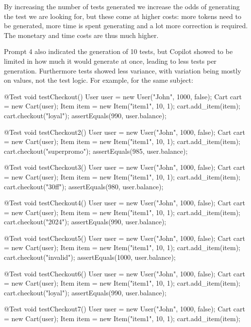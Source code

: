 By increasing the number of tests generated we increase the odds of generating the test we are looking for,
but these come at higher costs: more tokens need to be generated, more time is spent generating and a lot more
correction is required. The monetary and time costs are thus much higher.

Prompt 4 also indicated the generation of 10 tests, but Copilot showed to be limited in how much it would generate at once,
leading to less tests per generation. Furthermore tests showed less variance, with variation being mostly on values, not the
test logic. For example, for the same subject:
\begin{response}
    @Test
    void testCheckout() {
        User user = new User("John", 1000, false);
        Cart cart = new Cart(user);
        Item item = new Item("item1", 10, 1);
        cart.add_item(item);
        cart.checkout("loyal");
        assertEquals(990, user.balance);
    }

    @Test
    void testCheckout2() {
        User user = new User("John", 1000, false);
        Cart cart = new Cart(user);
        Item item = new Item("item1", 10, 1);
        cart.add_item(item);
        cart.checkout("superpromo");
        assertEquals(985, user.balance);
    }

    @Test
    void testCheckout3() {
        User user = new User("John", 1000, false);
        Cart cart = new Cart(user);
        Item item = new Item("item1", 10, 1);
        cart.add_item(item);
        cart.checkout("30ff");
        assertEquals(980, user.balance);
    }

    @Test
    void testCheckout4() {
        User user = new User("John", 1000, false);
        Cart cart = new Cart(user);
        Item item = new Item("item1", 10, 1);
        cart.add_item(item);
        cart.checkout("2024");
        assertEquals(990, user.balance);
    }

    @Test
    void testCheckout5() {
        User user = new User("John", 1000, false);
        Cart cart = new Cart(user);
        Item item = new Item("item1", 10, 1);
        cart.add_item(item);
        cart.checkout("invalid");
        assertEquals(1000, user.balance);
    }

    @Test
    void testCheckout6() {
        User user = new User("John", 1000, false);
        Cart cart = new Cart(user);
        Item item = new Item("item1", 10, 1);
        cart.add_item(item);
        cart.checkout("loyal");
        assertEquals(990, user.balance);
    }

    @Test
    void testCheckout7() {
        User user = new User("John", 1000, false);
        Cart cart = new Cart(user);
        Item item = new Item("item1", 10, 1);
        cart.add_item(item);
    }
\end{response}
